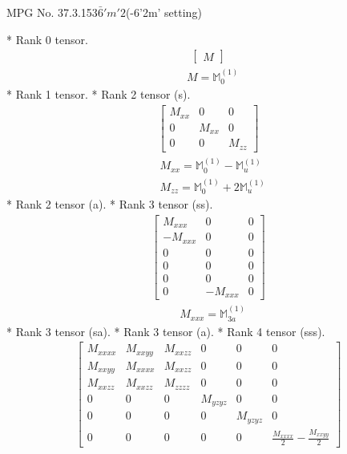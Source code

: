 \documentclass[fleqn,8pt,landscape]{jsarticle}
\begin{document}
\setcounter{MaxMatrixCols}{32}

\renewcommand{\tablename}{Table~}
\renewcommand{\figurename}{Figure~}
\begin{center}
\LARGE
MPG No. 37.3.153\quad$\bar{6}'m'2$\quad(-6'2m' setting)
\end{center}
* Rank 0 tensor.
\begin{align*}
\begin{bmatrix} M \end{bmatrix}
\end{align*}
\begin{align*}
& M = \mathbb{M}_{0}^{(1)}
\end{align*}
* Rank 1 tensor.
* Rank 2 tensor (s).
\begin{align*}
\begin{bmatrix} M_{xx} & 0 & 0 \\ 0 & M_{xx} & 0 \\ 0 & 0 & M_{zz} \end{bmatrix}
\end{align*}
\begin{align*}
& M_{xx} = \mathbb{M}_{0}^{(1)} - \mathbb{M}_{u}^{(1)} \\
& M_{zz} = \mathbb{M}_{0}^{(1)} + 2 \mathbb{M}_{u}^{(1)}
\end{align*}
* Rank 2 tensor (a).
* Rank 3 tensor (ss).
\begin{align*}
\begin{bmatrix} M_{xxx} & 0 & 0 \\ - M_{xxx} & 0 & 0 \\ 0 & 0 & 0 \\ 0 & 0 & 0 \\ 0 & 0 & 0 \\ 0 & - M_{xxx} & 0 \end{bmatrix}
\end{align*}
\begin{align*}
& M_{xxx} = \mathbb{M}_{3a}^{(1)}
\end{align*}
* Rank 3 tensor (sa).
* Rank 3 tensor (a).
* Rank 4 tensor (sss).
\begin{align*}
\begin{bmatrix} M_{xxxx} & M_{xxyy} & M_{xxzz} & 0 & 0 & 0 \\ M_{xxyy} & M_{xxxx} & M_{xxzz} & 0 & 0 & 0 \\ M_{xxzz} & M_{xxzz} & M_{zzzz} & 0 & 0 & 0 \\ 0 & 0 & 0 & M_{yzyz} & 0 & 0 \\ 0 & 0 & 0 & 0 & M_{yzyz} & 0 \\ 0 & 0 & 0 & 0 & 0 & \frac{M_{xxxx}}{2} - \frac{M_{xxyy}}{2} \end{bmatrix}
\end{align*}
\end{document}
